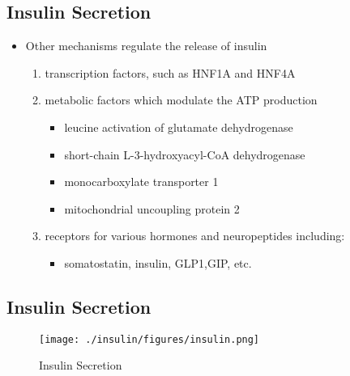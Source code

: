\documentclass{scrartcl}
\begin{document}
\subsection{Insulin Secretion}
\label{sec:org83f6379}
\begin{itemize}
\item Other mechanisms regulate the release of insulin
\begin{enumerate}
\item transcription factors, such as HNF1A and HNF4A

\item metabolic factors which modulate the ATP production
\begin{itemize}
\item leucine activation of glutamate dehydrogenase
\item short-chain L-3-hydroxyacyl-CoA dehydrogenase
\item monocarboxylate transporter 1
\item mitochondrial uncoupling protein 2
\end{itemize}
\item receptors for various hormones and neuropeptides including:
\begin{itemize}
\item somatostatin, insulin, GLP1,GIP, etc.
\end{itemize}
\end{enumerate}
\end{itemize}

\subsection{Insulin Secretion}
\label{sec:org716c45a}

\begin{figure}[htbp]
\centering
\texttt{[image: ./insulin/figures/insulin.png]}
\caption[insulin]{\label{fig:orge585290}
Insulin Secretion}
\end{figure}
\end{document}

